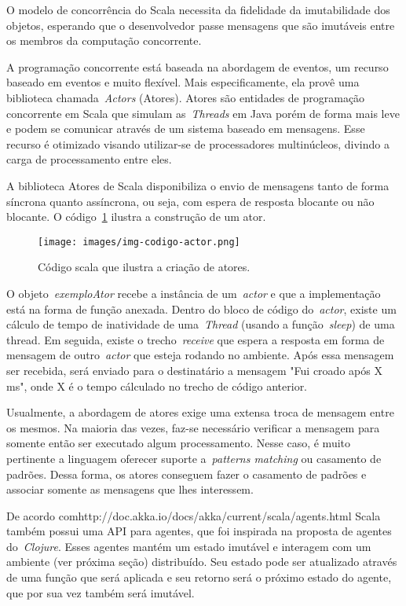 O modelo de concorrência do Scala necessita da fidelidade da imutabilidade dos objetos, esperando que o desenvolvedor passe mensagens que são imutáveis entre os membros da computação concorrente.

A programação concorrente está baseada na abordagem de eventos, um recurso baseado em eventos e muito flexível. Mais especificamente, ela provê uma biblioteca chamada~\emph{Actors} (Atores). Atores são entidades de programação concorrente em Scala que simulam as~\emph{Threads} em Java porém de forma mais leve e podem se comunicar através de um sistema baseado em mensagens. Esse recurso é otimizado visando utilizar-se de processadores multinúcleos, divindo a carga de processamento entre eles.

A biblioteca Atores de Scala disponibiliza o envio de mensagens tanto de forma síncrona quanto assíncrona, ou seja, com espera de resposta blocante ou não blocante. O código~\ref{fig:img-codigo-actor} ilustra a construção de um ator.

\begin{figure}
	\centering
	\texttt{[image: images/img-codigo-actor.png]}
	\caption{Código scala que ilustra a criação de atores.}
	\label{fig:img-codigo-actor}
\end{figure}

O objeto~\emph{exemploAtor} recebe a instância de um~\emph{actor} e que a implementação está na forma de função anexada. Dentro do bloco de código do~\emph{actor}, existe um cálculo de tempo de inatividade de uma~\emph{Thread} (usando a função~\emph{sleep}) de uma thread. Em seguida, existe o trecho~\emph{receive} que espera a resposta em forma de mensagem de outro~\emph{actor} que esteja rodando no ambiente. Após essa mensagem ser recebida, será enviado para o destinatário a mensagem "Fui croado após X ms", onde X é o tempo cálculado no trecho de código anterior.

Usualmente, a abordagem de atores exige uma extensa troca de mensagem entre os mesmos. Na maioria das vezes, faz-se necessário verificar a mensagem para somente então ser executado algum processamento. Nesse caso, é muito pertinente a linguagem oferecer suporte a~\emph{patterns matching} ou casamento de padrões. Dessa forma, os atores conseguem fazer o casamento de padrões e associar somente as mensagens que lhes interessem.

De acordo com{http://doc.akka.io/docs/akka/current/scala/agents.html} Scala também possui uma API para agentes, que foi inspirada na proposta de agentes do~\emph{Clojure}. Esses agentes mantém um estado imutável e interagem com um ambiente (ver próxima seção) distribuído. Seu estado pode ser atualizado através de uma função que será aplicada e seu retorno será o próximo estado do agente, que por sua vez também será imutável.


